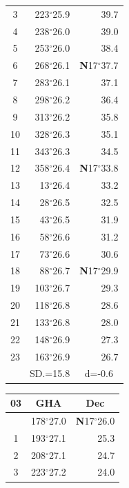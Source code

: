 \documentclass[10pt, a4paper]{report}
\begin{document}
\begin{scriptsize}
\begin{tabular*}{0.2\textwidth}[t]{@{\extracolsep{\fill}}|c|rr|}
3 & 223$^\circ$25.9 & \raisebox{0.24ex}{\boldmath$\cdot$~\boldmath$\cdot$~~}39.7\\
4 & 238$^\circ$26.0 & 39.0\\
5 & 253$^\circ$26.0 & 38.4\\[2Pt]
6 & 268$^\circ$26.1 & \textbf{N}17$^\circ$37.7\\
7 & 283$^\circ$26.1 & 37.1\\
8 & 298$^\circ$26.2 & 36.4\\
9 & 313$^\circ$26.2 & \raisebox{0.24ex}{\boldmath$\cdot$~\boldmath$\cdot$~~}35.8\\
10 & 328$^\circ$26.3 & 35.1\\
11 & 343$^\circ$26.3 & 34.5\\[2Pt]
12 & 358$^\circ$26.4 & \textbf{N}17$^\circ$33.8\\
13 & 13$^\circ$26.4 & 33.2\\
14 & 28$^\circ$26.5 & 32.5\\
15 & 43$^\circ$26.5 & \raisebox{0.24ex}{\boldmath$\cdot$~\boldmath$\cdot$~~}31.9\\
16 & 58$^\circ$26.6 & 31.2\\
17 & 73$^\circ$26.6 & 30.6\\[2Pt]
18 & 88$^\circ$26.7 & \textbf{N}17$^\circ$29.9\\
19 & 103$^\circ$26.7 & 29.3\\
20 & 118$^\circ$26.8 & 28.6\\
21 & 133$^\circ$26.8 & \raisebox{0.24ex}{\boldmath$\cdot$~\boldmath$\cdot$~~}28.0\\
22 & 148$^\circ$26.9 & 27.3\\
23 & 163$^\circ$26.9 & 26.7\\
\hline
\rule{0pt}{2.4ex} & \multicolumn{1}{c}{SD.=15.8} & \multicolumn{1}{c|}{d=-0.6}\\
\hline
\end{tabular*}\noindent
\begin{tabular*}{0.2\textwidth}[t]{@{\extracolsep{\fill}}|c|rr|}
\hline
\multicolumn{1}{|c|}{\rule{0pt}{2.6ex}\textbf{03}} & \multicolumn{1}{c}{\textbf{GHA}} & \multicolumn{1}{c|}{\textbf{Dec}}\\
\hline\rule{0pt}{2.6ex}\noindent
0 & 178$^\circ$27.0 & \textbf{N}17$^\circ$26.0\\
1 & 193$^\circ$27.1 & 25.3\\
2 & 208$^\circ$27.1 & 24.7\\
3 & 223$^\circ$27.2 & \raisebox{0.24ex}{\boldmath$\cdot$~\boldmath$\cdot$~~}24.0\\

\end{tabular*}
\end{scriptsize}
\end{document}
